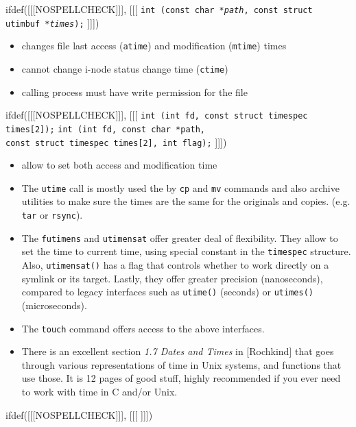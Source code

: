 \begin{slide}
ifdef([[[NOSPELLCHECK]]], [[[
\texttt{int (const char *\emph{path},
const struct utimbuf *\emph{times});}
]]])
\begin{itemize}
\item changes file last access (\texttt{atime}) and modification
(\texttt{mtime}) times
\item cannot change i-node status change time (\texttt{ctime})
\item calling process must have write permission for the file
\end{itemize}
ifdef([[[NOSPELLCHECK]]], [[[
\texttt{int (int fd, const struct timespec times[2]);}
\texttt{int (int fd, const char *path, \\
const struct timespec times[2], int flag);}
]]])
\begin{itemize}
\item allow to set both access and modification time
\end{itemize}
\end{slide}

\begin{itemize}
\item The \texttt{utime} call is mostly used the by \texttt{cp} and \texttt{mv}
commands and also archive utilities to make sure the times are the same for the
originals and copies. (e.g. \texttt{tar} or \texttt{rsync}).
\item The \texttt{futimens} and \texttt{utimensat} offer greater deal of
flexibility. They allow to set the time to current time, using special
constant in the \texttt{timespec} structure. Also, \texttt{utimensat()}
has a flag that controls whether to work directly on a symlink or its target.
Lastly, they offer greater precision (nanoseconds), compared to legacy
interfaces such as \texttt{utime()} (seconds) or \texttt{utimes()}
(microseconds).
\item The \texttt{touch} command offers access to the above interfaces.
\item There is an excellent section \emph{1.7 Dates and Times} in [Rochkind]
that goes through various representations of time in Unix systems, and functions
that use those.  It is 12 pages of good stuff, highly recommended if you ever
need to work with time in C and/or Unix.
\end{itemize}


ifdef([[[NOSPELLCHECK]]], [[[
]]])


